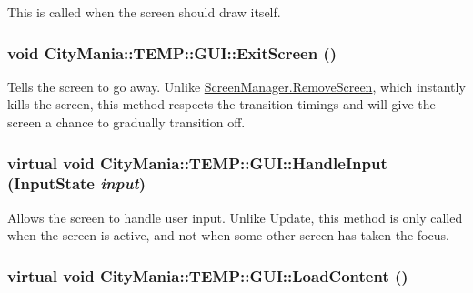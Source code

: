 This is called when the screen should draw itself. \hypertarget{classCityMania_1_1TEMP_1_1GUI_aa9856006e0de2b33f01205e004dbae6f}{
\subsubsection[{ExitScreen}]{\setlength{\rightskip}{0pt plus 5cm}void CityMania::TEMP::GUI::ExitScreen ()}}
\label{classCityMania_1_1TEMP_1_1GUI_aa9856006e0de2b33f01205e004dbae6f}


Tells the screen to go away. Unlike \hyperlink{classCityMania_1_1TEMP_1_1ScreenManager_a89569f0a358ed32c83beed2913194a88}{ScreenManager.RemoveScreen}, which instantly kills the screen, this method respects the transition timings and will give the screen a chance to gradually transition off. \hypertarget{classCityMania_1_1TEMP_1_1GUI_af9343aac3653346155565bf50e4995a3}{
\subsubsection[{HandleInput}]{\setlength{\rightskip}{0pt plus 5cm}virtual void CityMania::TEMP::GUI::HandleInput ({\bf InputState} {\em input})}}
\label{classCityMania_1_1TEMP_1_1GUI_af9343aac3653346155565bf50e4995a3}


Allows the screen to handle user input. Unlike Update, this method is only called when the screen is active, and not when some other screen has taken the focus. \hypertarget{classCityMania_1_1TEMP_1_1GUI_a12d7db05d306439cb79b57e379c45091}{
\subsubsection[{LoadContent}]{\setlength{\rightskip}{0pt plus 5cm}virtual void CityMania::TEMP::GUI::LoadContent ()}}
\label{classCityMania_1_1TEMP_1_1GUI_a12d7db05d306439cb79b57e379c45091}


